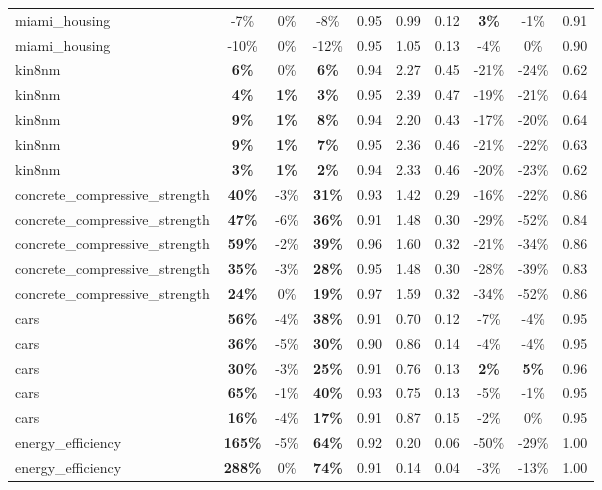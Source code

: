 \begin{table}[!htbp]
\begin{small}
\begin{sc}
{\begin{tabular}{lccccccccc}
miami\_housing & -7\% & 0\% & -8\% & 0.95 & 0.99 & 0.12 & \textbf{3\%} & -1\% & 0.91 \\
miami\_housing & -10\% & 0\% & -12\% & 0.95 & 1.05 & 0.13 & -4\% & 0\% & 0.90 \\
kin8nm & \textbf{6\%} & 0\% & \textbf{6\%} & 0.94 & 2.27 & 0.45 & -21\% & -24\% & 0.62 \\
kin8nm & \textbf{4\%} & \textbf{1\%} & \textbf{3\%} & 0.95 & 2.39 & 0.47 & -19\% & -21\% & 0.64 \\
kin8nm & \textbf{9\%} & \textbf{1\%} & \textbf{8\%} & 0.94 & 2.20 & 0.43 & -17\% & -20\% & 0.64 \\
kin8nm & \textbf{9\%} & \textbf{1\%} & \textbf{7\%} & 0.95 & 2.36 & 0.46 & -21\% & -22\% & 0.63 \\
kin8nm & \textbf{3\%} & \textbf{1\%} & \textbf{2\%} & 0.94 & 2.33 & 0.46 & -20\% & -23\% & 0.62 \\
concrete\_compressive\_strength & \textbf{40\%} & -3\% & \textbf{31\%} & 0.93 & 1.42 & 0.29 & -16\% & -22\% & 0.86 \\
concrete\_compressive\_strength & \textbf{47\%} & -6\% & \textbf{36\%} & 0.91 & 1.48 & 0.30 & -29\% & -52\% & 0.84 \\
concrete\_compressive\_strength & \textbf{59\%} & -2\% & \textbf{39\%} & 0.96 & 1.60 & 0.32 & -21\% & -34\% & 0.86 \\
concrete\_compressive\_strength & \textbf{35\%} & -3\% & \textbf{28\%} & 0.95 & 1.48 & 0.30 & -28\% & -39\% & 0.83 \\
concrete\_compressive\_strength & \textbf{24\%} & 0\% & \textbf{19\%} & 0.97 & 1.59 & 0.32 & -34\% & -52\% & 0.86 \\
cars & \textbf{56\%} & -4\% & \textbf{38\%} & 0.91 & 0.70 & 0.12 & -7\% & -4\% & 0.95 \\
cars & \textbf{36\%} & -5\% & \textbf{30\%} & 0.90 & 0.86 & 0.14 & -4\% & -4\% & 0.95 \\
cars & \textbf{30\%} & -3\% & \textbf{25\%} & 0.91 & 0.76 & 0.13 & \textbf{2\%} & \textbf{5\%} & 0.96 \\
cars & \textbf{65\%} & -1\% & \textbf{40\%} & 0.93 & 0.75 & 0.13 & -5\% & -1\% & 0.95 \\
cars & \textbf{16\%} & -4\% & \textbf{17\%} & 0.91 & 0.87 & 0.15 & -2\% & 0\% & 0.95 \\
energy\_efficiency & \textbf{165\%} & -5\% & \textbf{64\%} & 0.92 & 0.20 & 0.06 & -50\% & -29\% & 1.00 \\
energy\_efficiency & \textbf{288\%} & 0\% & \textbf{74\%} & 0.91 & 0.14 & 0.04 & -3\% & -13\% & 1.00 \\

\end{tabular}}
\end{sc}
\end{small}
\end{table}

